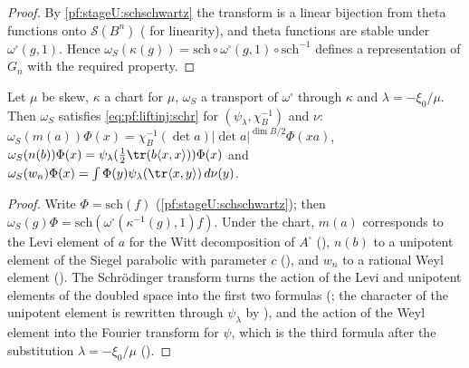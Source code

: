 \begin{proof}
By \cref{pf:stageU:schschwartz} the transform is a linear bijection from theta functions onto $\mathcal S(B^n)$
( for linearity), and theta functions are stable under
$\omega^\square(g,1)$. Hence $\omega_S(\kappa(g))=\mathrm{sch}\circ\omega^\square(g,1)\circ\mathrm{sch}^{-1}$ defines a representation of $G_n$ with
the required property.
\end{proof}

\begin{lemma}\label{pf:stageU:schrformulas}
Let $\mu$ be skew, $\kappa$ a chart for $\mu$, $\omega_S$ a transport of $\omega^\square$ through $\kappa$ and $\lambda=-\xi_0/\mu$. Then
$\omega_S$ satisfies \eqref{eq:pf:liftinj:schr} for $(\psi_\lambda,\chi_B^{-1})$ and $\nu$:
$\omega_S(m(a))\Phi(x)=\chi_B^{-1}(\det a)|\det a|^{\dim B/2}\Phi(xa)$, $\omega_S(n(b))\Phi(x)=\psi_\lambda(\frac12\tr(b\langle x,x\rangle))\Phi(x)$ and
$\omega_S(w_n)\Phi(x)=\int\Phi(y)\psi_\lambda(\tr\langle x,y\rangle)\,d\nu(y)$.
\end{lemma}

\begin{proof}
Write $\Phi=\mathrm{sch}(f)$ (\cref{pf:stageU:schschwartz}); then $\omega_S(g)\Phi=\mathrm{sch}(\omega^\square(\kappa^{-1}(g),1)f)$. Under the chart,
$m(a)$ corresponds to the Levi element of $a$ for the Witt decomposition of $A^\square$
(), $n(b)$ to a unipotent element of the Siegel parabolic with
parameter $c$ (), and $w_n$ to a rational Weyl element
(). The Schr\"odinger transform turns the action of the Levi and
unipotent elements of the doubled space into the first two formulas
(; the character of the unipotent element is rewritten
through $\psi_\lambda$ by ), and the action of the Weyl element into the Fourier
transform for $\psi$, which is the third formula after the substitution $\lambda=-\xi_0/\mu$
(). 
\end{proof}

